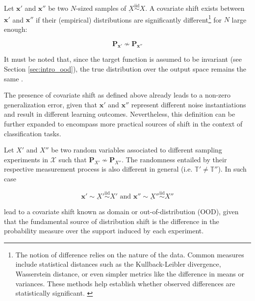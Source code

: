 \begin{definition}
    Let $\bm{x}'$ and $\bm{x}''$ be two $N$-sized samples of $\underbar{X} \overset{\text{iid}}{\sim} X$.
    A covariate shift exists between $\bm{x}'$ and $\bm{x}''$ if their
    (empirical) distributions are significantly different\footnote{
        The notion of difference relies on the nature of the data. Common measures 
        include statistical distances such as the Kullback-Leibler divergence, 
        Wasserstein distance, or even simpler metrics like the difference in 
        means or variances. These methods help establish whether observed 
        differences are statistically significant. \cite{quinonero-candelaDatasetShiftMachine2009}
    }
    for $N$ large enough:

    $$
    \mathbf{P}_{\bm{x}'} \not \sim \mathbf{P}_{\bm{x}''}
    $$
    
    It must be noted that, since the target function is assumed
    to be invariant (see Section \ref{sec:intro_ood}), 
    the true distribution over the output space
    remains the same \cite{quinonero-candelaDatasetShiftMachine2009}.
\end{definition}

The presence of covariate shift as defined above already leads
to a non-zero generalization error, given that $\bm{x}'$ and $\bm{x}''$ 
represent different noise instantiations and result in different 
learning outcomes. Nevertheless, this definition can be further
expanded to encompass more practical sources of shift in the 
context of classification tasks.

\begin{definition}\label{def:domain_shift}
    Let $X'$ and $X''$ be two random variables associated to different sampling 
    experiments in $\mathcal{X}$ such that $\mathbf{P}_{X'} \not \sim \mathbf{P}_{X''}$.
    The randomness entailed by their respective measurement process is also different
    in general (i.e. $\mathbb{T}' \neq \mathbb{T}''$). In such case

    $$
        \bm{x}' \sim \underbar{X}' \overset{\text{iid}}{\sim} X' \text{ and } \bm{x}'' \sim \underbar{X}'' \overset{\text{iid}}{\sim} X''
    $$

    lead to a covariate shift known as domain or out-of-distribution (OOD), given that 
    the fundamental source of distribution shift is the difference in the probability
    measure over the support induced by each experiment. \cite{quinonero-candelaDatasetShiftMachine2009}
\end{definition}

